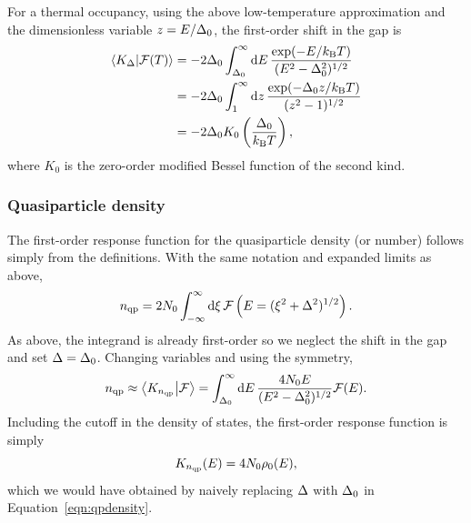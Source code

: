 For a thermal occupancy, using the above low-temperature approximation and the dimensionless variable
$z = E / \Delta_0$,
the first-order shift in the gap is
\begin{align}
\braket{K_\Delta}{\mathcal{F}(T)}
  &=
  -2 \Delta_0 \int_{\Delta_0}^\infty \dd{E}
  \frac{\exp(-E / k_\mathrm{B} T)}{(E^2 - \Delta_0^2)^{1/2}} \\
  &=
  -2 \Delta_0 \int_1^\infty \dd{z} \frac{\exp(-\Delta_0 z / k_\mathrm{B} T)}{(z^2 - 1)^{1/2}} \\
  &=
  -2 \Delta_0 K_0 \left( \frac{\Delta_0}{k_\mathrm{B} T} \right),
\label{eqn:first-order_response.responseqpoccupancy_gap_thermal}
\end{align}
where $K_0$ is the zero-order modified Bessel function of the second kind.

\subsubsection{Quasiparticle density}

The first-order response function for the quasiparticle density (or number) follows simply from the definitions.
With the same notation and expanded limits as above,
\begin{equation}
n_{\mathrm{qp}}
  =
  2 N_0 \int_{-\infty}^{\infty} \dd{\xi}
  \mathcal{F} \left( E = (\xi^2 + \Delta^2)^{1/2} \right).
\end{equation}
As above, the integrand is already first-order so we neglect the shift in the gap and set $\Delta = \Delta_0$.
Changing variables and using the symmetry,
\begin{equation}
n_{\mathrm{qp}}
  \approx
  \braket{K_{n_{\mathrm{qp}}}}{\mathcal{F}}
  =
  \int_{\Delta_0}^{\infty} \dd{E}
  \frac{4 N_0 E}{(E^2 - \Delta_0^2)^{1/2}}
  \mathcal{F}(E).
\end{equation}
Including the cutoff in the density of states, the first-order response function is simply
\begin{equation}
K_{n_{\mathrm{qp}}}(E)
  =
  4 N_0 \rho_0(E),
\label{eqn:first-order_response.responseqpoccupancy_qpdensity}
\end{equation}
which we would have obtained by naively replacing $\Delta$ with $\Delta_0$ in Equation~\ref{eqn:qpdensity}.

